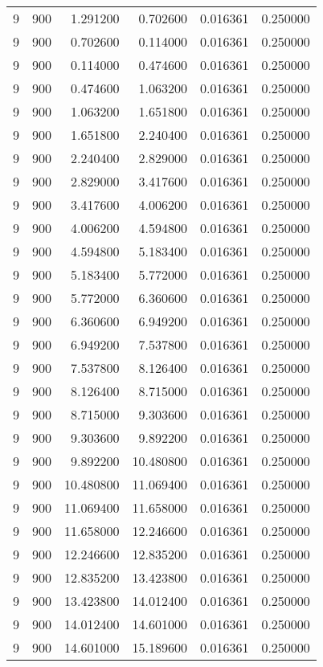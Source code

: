 \begin{longtable}{rrrrrr}
9 & 900 & 1.291200 & 0.702600 & 0.016361 & 0.250000 \\
9 & 900 & 0.702600 & 0.114000 & 0.016361 & 0.250000 \\
9 & 900 & 0.114000 & 0.474600 & 0.016361 & 0.250000 \\
9 & 900 & 0.474600 & 1.063200 & 0.016361 & 0.250000 \\
9 & 900 & 1.063200 & 1.651800 & 0.016361 & 0.250000 \\
9 & 900 & 1.651800 & 2.240400 & 0.016361 & 0.250000 \\
9 & 900 & 2.240400 & 2.829000 & 0.016361 & 0.250000 \\
9 & 900 & 2.829000 & 3.417600 & 0.016361 & 0.250000 \\
9 & 900 & 3.417600 & 4.006200 & 0.016361 & 0.250000 \\
9 & 900 & 4.006200 & 4.594800 & 0.016361 & 0.250000 \\
9 & 900 & 4.594800 & 5.183400 & 0.016361 & 0.250000 \\
9 & 900 & 5.183400 & 5.772000 & 0.016361 & 0.250000 \\
9 & 900 & 5.772000 & 6.360600 & 0.016361 & 0.250000 \\
9 & 900 & 6.360600 & 6.949200 & 0.016361 & 0.250000 \\
9 & 900 & 6.949200 & 7.537800 & 0.016361 & 0.250000 \\
9 & 900 & 7.537800 & 8.126400 & 0.016361 & 0.250000 \\
9 & 900 & 8.126400 & 8.715000 & 0.016361 & 0.250000 \\
9 & 900 & 8.715000 & 9.303600 & 0.016361 & 0.250000 \\
9 & 900 & 9.303600 & 9.892200 & 0.016361 & 0.250000 \\
9 & 900 & 9.892200 & 10.480800 & 0.016361 & 0.250000 \\
9 & 900 & 10.480800 & 11.069400 & 0.016361 & 0.250000 \\
9 & 900 & 11.069400 & 11.658000 & 0.016361 & 0.250000 \\
9 & 900 & 11.658000 & 12.246600 & 0.016361 & 0.250000 \\
9 & 900 & 12.246600 & 12.835200 & 0.016361 & 0.250000 \\
9 & 900 & 12.835200 & 13.423800 & 0.016361 & 0.250000 \\
9 & 900 & 13.423800 & 14.012400 & 0.016361 & 0.250000 \\
9 & 900 & 14.012400 & 14.601000 & 0.016361 & 0.250000 \\
9 & 900 & 14.601000 & 15.189600 & 0.016361 & 0.250000 \\

\end{longtable}
